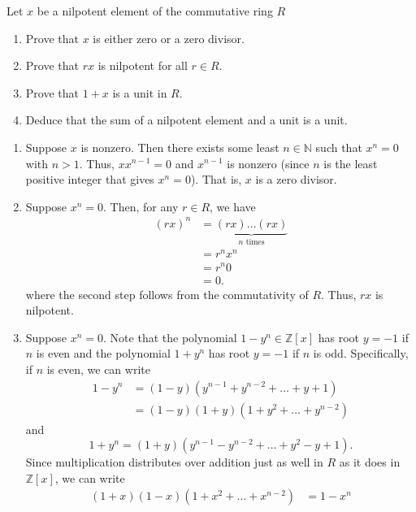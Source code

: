 \documentclass[12 pt, letterpaper]{hmcpset}
\begin{document}
\begin{problem}
	Let $x$  be a nilpotent element of the commutative ring $R$ 
	\begin{enumerate}
		\item Prove that $x$ is either zero or a zero divisor.
		\item Prove that $rx$ is nilpotent for all $r \in R$.
		\item Prove that $1 + x$ is a unit in $R$.
		\item Deduce that the sum of a nilpotent element and a unit is a unit.
	\end{enumerate}
\end{problem}

\begin{solution}
	\begin{enumerate}
		\item Suppose $x$ is nonzero. Then there exists some least $n \in \mathbb{N}$ such that $x^{n} = 0$ with $n > 1$. Thus, $x x^{n - 1} = 0$ and $x^{n - 1}$ is nonzero (since $n$ is the least positive integer that gives $x^{n} = 0$). That is, $x$ is a zero divisor.
		\item Suppose $x^{n} = 0$. Then, for any $r \in R$, we have
			\[
				\begin{split}
					(rx)^{n} & = \underbrace{(rx) \dots (rx)}_{n \text{ times}} \\
						 & = r^{n} x^{n} \\
						 & = r^{n} 0 \\
						 & = 0.
				\end{split}
			\]
			where the second step follows from the commutativity of $R$. Thus, $rx$ is nilpotent.
		\item Suppose $x^{n} = 0$. Note that the polynomial $1 - y^{n} \in \mathbb{Z}[x]$ has root $y = - 1$ if $n$ is even and the polynomial $1 + y^{n}$ has root $y = -1$ if $n$ is odd. Specifically, if $n$ is even, we can write
			\[
				\begin{split}
					1 - y^{n} & = (1 - y)(y^{n - 1} + y^{n - 2} + \dots + y + 1) \\
						  & = (1 - y)(1 + y)(1 + y^{2} + \dots + y^{n - 2})
				\end{split}
			\]
			and
			\[
				1 + y^{n} = (1 + y)(y^{n - 1} - y^{n - 2} + \dots + y^{2} - y + 1).
			\]
			Since multiplication distributes over addition just as well in $R$ as it does in $\mathbb{Z}[x]$, we can write
			\[
				\begin{split}
					(1 + x)(1 - x)(1 + x^{2} + \dots + x^{n - 2}) & = 1 - x^{n} \\

\end{split}\]
\end{enumerate}
\end{solution}
\end{document}

